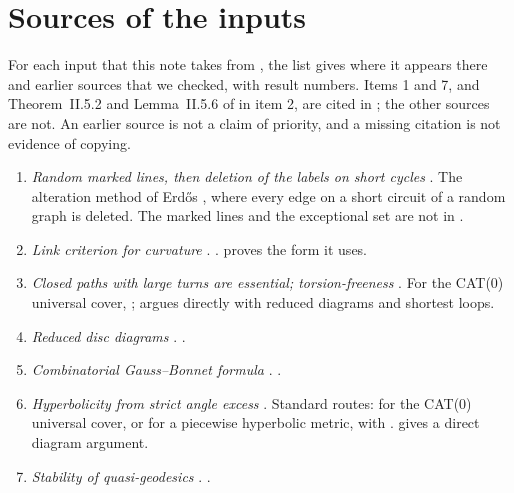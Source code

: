 \documentclass[11pt]{article}
\theoremstyle{definition}
\theoremstyle{remark}
\numberwithin{equation}{section}
\begin{document}
\appendix

\section{Sources of the inputs}\label{app:sources}

For each input that this note takes from \cite{OAI252}, the list gives where it appears there and earlier sources that we checked, with result numbers. Items 1 and 7, and Theorem~II.5.2 and Lemma~II.5.6 of \cite{BH1999} in item 2, are cited in \cite{OAI252}; the other sources are not. An earlier source is not a claim of priority, and a missing citation is not evidence of copying.

{\small
\begin{enumerate}[label=\arabic*.,leftmargin=*,itemsep=2pt]
\item \emph{Random marked lines, then deletion of the labels on short cycles} \cite[Lemma~2.2]{OAI252}. The alteration method of Erd\H{o}s \cite[proof of (4), pp.~35--37]{Erdos1959}, where every edge on a short circuit of a random graph is deleted. The marked lines and the exceptional set are not in \cite{Erdos1959}.
\item \emph{Link criterion for curvature} \cite[Theorem~2.1, Lemma~2.3]{OAI252}. \cite[Theorem~II.5.2, Theorem~II.5.4 and Lemma~II.5.6]{BH1999}. \cite{OAI252} proves the form it uses.
\item \emph{Closed paths with large turns are essential; torsion-freeness} \cite[Propositions~3.3 and~3.4]{OAI252}. For the CAT(0) universal cover, \cite[Proposition~II.1.4(2) and Corollary~II.2.8(1)]{BH1999}; \cite{OAI252} argues directly with reduced diagrams and shortest loops.
\item \emph{Reduced disc diagrams} \cite[Lemma~3.2]{OAI252}. \cite[Lemmas~2.16 and~2.17]{McCammondWise2002}.
\item \emph{Combinatorial Gauss--Bonnet formula} \cite[(3.1)]{OAI252}. \cite[Definition~4.4 and Theorem~4.6]{McCammondWise2002}.
\item \emph{Hyperbolicity from strict angle excess} \cite[Lemma~4.1, Proposition~4.3]{OAI252}. Standard routes: \cite[Theorem~III.H.1.5]{BH1999} for the CAT(0) universal cover, or \cite[Proposition~III.H.1.2]{BH1999} for a piecewise hyperbolic metric, with \cite[Proposition~I.8.19 and Theorem~III.H.1.9]{BH1999}. \cite{OAI252} gives a direct diagram argument.
\item \emph{Stability of quasi-geodesics} \cite[Lemma~4.2]{OAI252}. \cite[Theorem~III.H.1.7]{BH1999}.

\end{enumerate}}
\end{document}

